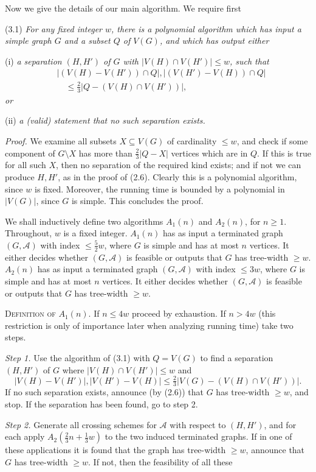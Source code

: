 
Now we give the details of our main algorithm. We require first

\stmt
(3.1) \textit{For any fixed integer $w$, there is a polynomial algorithm which has input a simple graph $G$ and a subset $Q$ of $V(G)$, and which has output either}

\hspace*{12pt}(i) \textit{a separation $(H, H')$ of $G$ with $|V(H) \cap V(H')| \le w$, such that}
\begin{align*}
&|(V(H) - V(H')) \cap Q|, |(V(H') - V(H)) \cap Q| \\
&\quad \le \tfrac{2}{3} |Q - (V(H) \cap V(H'))|,
\end{align*}
\textit{or}

\hspace*{12pt}(ii) \textit{a (valid) statement that no such separation exists.}

\textit{Proof.} We examine all subsets $X \subseteq V(G)$ of cardinality $\le w$, and check if some component of $G \setminus X$ has more than $\tfrac{2}{3}|Q - X|$ vertices which are in $Q$. If this is true for all such $X$, then no separation of the required kind exists; and if not we can produce $H, H'$, as in the proof of (2.6). Clearly this is a polynomial algorithm, since $w$ is fixed. Moreover, the running time is bounded by a polynomial in $|V(G)|$, since $G$ is simple. This concludes the proof.

We shall inductively define two algorithms $A_1(n)$ and $A_2(n)$, for $n \ge 1$. Throughout, $w$ is a fixed integer. $A_1(n)$ has as input a terminated graph $(G, \mathscr{A})$ with index $\le \tfrac{5}{2}w$, where $G$ is simple and has at most $n$ vertices. It either decides whether $(G, \mathscr{A})$ is feasible or outputs that $G$ has tree-width $\ge w$. $A_2(n)$ has as input a terminated graph $(G, \mathscr{A})$ with index $\le 3w$, where $G$ is simple and has at most $n$ vertices. It either decides whether $(G, \mathscr{A})$ is feasible or outputs that $G$ has tree-width $\ge w$.

\textsc{Definition of} $A_1(n)$. If $n \le 4w$ proceed by exhaustion. If $n > 4w$ (this restriction is only of importance later when analyzing running time) take two steps.

\textit{Step 1.} Use the algorithm of (3.1) with $Q = V(G)$ to find a separation $(H, H')$ of $G$ where $|V(H) \cap V(H')| \le w$ and
\begin{equation*}
|V(H) - V(H')|, |V(H') - V(H)| \le \tfrac{2}{3}|V(G) - (V(H) \cap V(H'))|.
\end{equation*}
If no such separation exists, announce (by (2.6)) that $G$ has tree-width $\ge w$, and stop. If the separation has been found, go to step 2.

\textit{Step 2.} Generate all crossing schemes for $\mathscr{A}$ with respect to $(H, H')$, and for each apply $A_2(\tfrac{2}{3}n + \tfrac{1}{3}w)$ to the two induced terminated graphs. If in one of these applications it is found that the graph has tree-width $\ge w$, announce that $G$ has tree-width $\ge w$. If not, then the feasibility of all these
